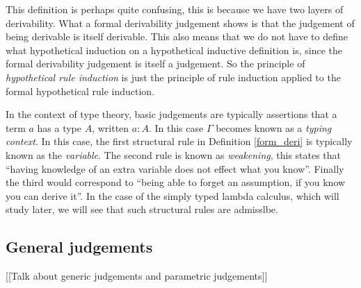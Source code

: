 \begin{remark}
    This definition is perhaps quite confusing, this is because we have two layers of derivability. What a formal derivability judgement shows is that the judgement of being derivable is itself derivable. This also means that we do not have to define what hypothetical induction on a hypothetical inductive definition is, since the formal derivability judgement is itself a judgement. So the principle of \emph{hypothetical rule induction} is just the principle of rule induction applied to the formal hypothetical rule induction.
\end{remark}

\begin{remark}\label{structural_remark}
    In the context of type theory, basic judgements are typically assertions that a term $a$ has a type $A$, written $a : A$. In this case $\Gamma$ becomes known as a \emph{typing context}. In this case, the first structural rule in Definition \ref{form_deri} is typically known as the \emph{variable}.
    The second rule is known as \emph{weakening}, this states that ``having knowledge of an extra variable does not effect what you know''. Finally the third would correspond to ``being able to forget an assumption, if you know you can derive it''. In the case of the simply typed lambda calculus, which will study later, we will see that such structural rules are admisslbe. 
\end{remark}

\subsection{General judgements}

[[Talk about generic judgements and parametric judgements]]










